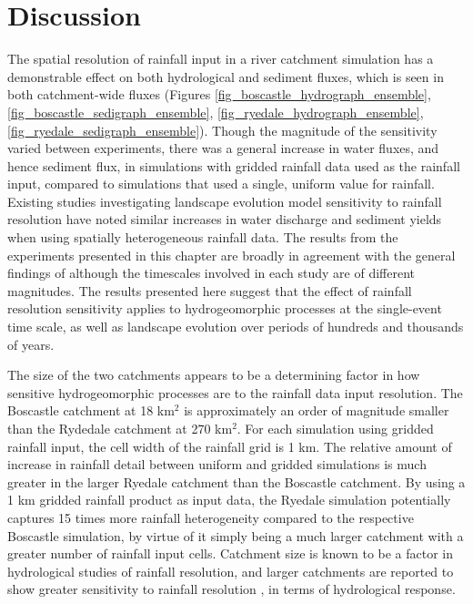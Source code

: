 \section{Discussion}
The spatial resolution of rainfall input in a river catchment simulation has a demonstrable effect on both hydrological and sediment fluxes, which is seen in both catchment-wide fluxes (Figures \ref{fig_boscastle_hydrograph_ensemble}, \ref{fig_boscastle_sedigraph_ensemble}, \ref{fig_ryedale_hydrograph_ensemble}, \ref{fig_ryedale_sedigraph_ensemble}). Though the magnitude of the sensitivity varied between experiments, there was a general increase in water fluxes, and hence sediment flux, in simulations with gridded rainfall data used as the rainfall input, compared to simulations that used a single, uniform value for rainfall. Existing studies investigating landscape evolution model sensitivity to rainfall resolution \citep{coulthard2016sensitivity} have noted similar increases in water discharge and sediment yields when using spatially heterogeneous rainfall data. The results from the experiments presented in this chapter are broadly in agreement with the general findings of \citet{coulthard2016sensitivity} although the timescales involved in each study are of different magnitudes. The results presented here suggest that the effect of rainfall resolution sensitivity applies to hydrogeomorphic processes at the single-event time scale, as well as landscape evolution over periods of hundreds and thousands of years.

The size of the two catchments appears to be a determining factor in how sensitive hydrogeomorphic processes are to the rainfall data input resolution. The Boscastle catchment at 18 km\(^2\) is approximately an order of magnitude smaller than the Rydedale catchment at 270 km\(^2\). For each simulation using gridded rainfall input, the cell width of the rainfall grid is 1 km. The relative amount of increase in rainfall detail between uniform and gridded simulations is much greater in the larger Ryedale catchment than the Boscastle catchment. By using a 1 km gridded rainfall product as input data, the Ryedale simulation potentially captures 15 times more rainfall heterogeneity compared to the respective Boscastle simulation, by virtue of it simply being a much larger catchment with a greater number of rainfall input cells. Catchment size is known to be a factor in hydrological studies of rainfall resolution, and larger catchments are reported to show greater sensitivity to rainfall resolution \citep[e.g.][]{nicotina2008impact}, in terms of hydrological response.

